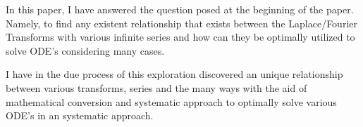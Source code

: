 {In this paper, I have answered the question posed at the beginning of the paper. Namely, to find any existent relationship that exists between the Laplace/Fourier Transforms with various infinite series and how can they be optimally utilized to solve ODE's  considering many cases.}

{I have in the due process of this exploration discovered an unique relationship between various transforms, series and the many ways with the aid of mathematical conversion and systematic approach to optimally solve various ODE's in an systematic approach.}

